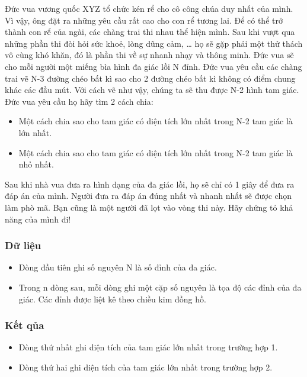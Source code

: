 



   Đức vua vương quốc XYZ tổ chức kén rể cho cô công chúa duy nhất của mình. Vì vậy, ông đặt ra những yêu cầu rất cao cho con rể tương lai. Để có thể trở thành con rể của ngài, các chàng trai thi nhau thể hiện mình. Sau khi vượt qua những phần thi đòi hỏi sức khoẻ, lòng dũng cảm, … họ sẽ gặp phải một thử thách vô cùng khó khăn, đó là phần thi về sự nhanh nhạy và thông minh. Đức vua sẽ cho mỗi người một miếng bìa hình đa giác lồi N đỉnh. Đức vua yêu cầu các chàng trai vẽ N-3 đường chéo bất kì sao cho 2 đường chéo bất kì không có điểm chung khác các đầu mút. Với cách vẽ như vậy, chúng ta sẽ thu được N-2 hình tam giác. Đức vua yêu cầu họ hãy tìm 2 cách chia:  
\begin{itemize}
	\item     Một cách chia sao cho tam giác có diện tích lớn nhất trong N-2 tam giác là lớn nhất.   
	\item     Một cách chia sao cho tam giác có diện tích lớn nhất trong N-2 tam giác là nhỏ nhất.   
\end{itemize}

   Sau khi nhà vua đưa ra hình dạng của đa giác lồi, họ sẽ chỉ có 1 giây để đưa ra đáp án của mình. Người đưa ra đáp án đúng nhất và nhanh nhất sẽ được chọn làm phò mã. Bạn cũng là một người đã lọt vào vòng thi này. Hãy chứng tỏ khả năng của mình đi!  

\subsubsection{   Dữ liệu  }
\begin{itemize}
	\item     Dòng đầu tiên ghi số nguyên N là số đỉnh của đa giác.   
	\item     Trong n dòng sau, mỗi dòng ghi một cặp số nguyên là tọa độ các đỉnh của đa giác. Các đỉnh được liệt kê theo chiều kim đồng hồ.   
\end{itemize}

\subsubsection{   Kết qủa  }
\begin{itemize}
	\item     Dòng thứ nhất ghi diện tích của tam giác lớn nhất trong trường hợp 1.   
	\item     Dòng thứ hai ghi diện tích của tam giác lớn nhất trong trường hợp 2.   
\end{itemize}

